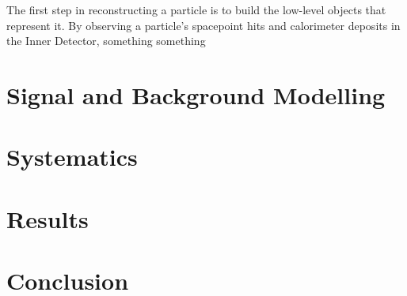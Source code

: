 \documentclass[12pt,a4paper,epsf,portrait,times,epsfig]{report}
\begin{document}
		The first step in reconstructing a particle is to build the low-level objects that represent it. By observing a particle's spacepoint hits and calorimeter deposits in the Inner Detector, something something

		\chapter{Signal and Background Modelling}

		\chapter{Systematics}

		\chapter{Results}

		\chapter{Conclusion}

		
		
			
				
\end{document}
